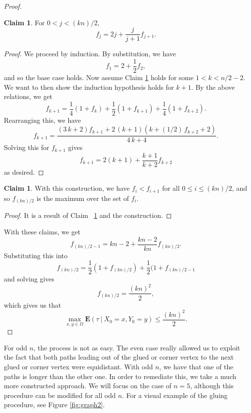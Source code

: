 \documentclass[10pt,a4paper]{amsart}
\theoremstyle{definition}
\numberwithin{definition}{section}
\newtheorem{claim}[definition]{Claim}
\begin{document}
\begin{proof}
\begin{claim}\label{claim:1}
For $0 < j < (kn)/2$, 
\[ f_j = 2j + \frac{j}{j+1} f_{j+1}. \]
\end{claim}

\begin{proof}
We proceed by induction. By substitution, we have
\[ f_1 = 2 + \frac{1}{2}f_2,\] 
and so the base case holds. Now assume Claim \ref{claim:1} holds for some $1 < k < n/2-2$. We want to then show the induction hypothesis holds for $k+1$. By the above relations, we get 
\[ f_{k+1} = \frac{1}{4}(1 + f_{k}) + \frac{1}{2}(1+ f_{k+1}) + \frac{1}{4}(1+f_{k+2}). \]
Rearranging this, we have 
\[f_{k+1} ={\frac { \left( 3\,k+2 \right) f_{k+1} +2\, \left( k+1 \right)  \left( k+(1/2)\,f_{k+2}  +2 \right) }{4\,k+4}}.\]
Solving this for $f_{k+1}$ gives
\[ f_{k+1} = 2(k+1) + \frac{k+1}{k+2} f_{k+2}\]
as desired.
\end{proof} 

\begin{claim}
With this construction, we have $f_i < f_{i+1}$ for all $0 \leq i \leq (kn)/2$, and so $f_{(kn)/2}$ is the maximum over the set of $f_i$.
\end{claim}

\begin{proof}
It is a result of Claim ~\ref{claim:1} and the construction.
\end{proof}

\noindent With these claims, we get   
\[f_{(kn)/2-1} = kn - 2 + \frac{kn-2}{kn} f_{(kn)/2}. \]
Substituting this into
\[ f_{(kn)/2} = \frac{1}{2}\left(1 + f_{(kn)/2} \right) + \frac{1}{2}(1 + f_{(kn)/2-1} \] 
and solving gives
\[f_{(kn)/2} = \frac{(kn)^2}{2},\]
which gives us that 
\[ \max_{x,y \in \Omega} \mathbf{E}(\tau \ | \ X_0 = x, Y_0 =y) \leq \frac{(kn)^2}{2}.\]


\end{proof}

For odd $n$, the process is not as easy. The even case really allowed us to exploit the fact that both paths leading out of the glued or corner vertex to the next glued or corner vertex were equidistant. With odd $n$, we have that one of the paths is longer than the other one. In order to remediate this, we take a much more constructed approach. We will focus on the case of $n =5$, although this procedure can be modified for all odd $n$. For a visual example of the gluing procedure, see Figure \ref{fig:graph2}.
\end{document}

